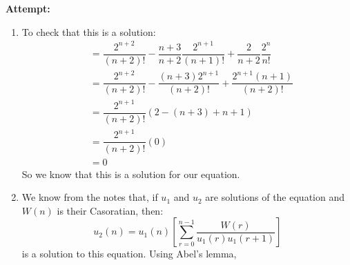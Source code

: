 \documentclass[12pt,letterpaper]{article}
\theoremstyle{definition}
\begin{document}
\textbf{Attempt:}
\begin{changemargin}{.5cm}{0cm}

\begin{enumerate}[label=(\alph*)]
    \item To check that this is a solution: \begin{align*}
        &=\dfrac{2^{n+2}}{(n+2)!} - \dfrac{n+3}{n+2}\dfrac{2^{n+1}}{(n+1)!} + \dfrac{2}{n+2}\dfrac{2^n}{n!}\\
        &=\dfrac{2^{n+2}}{(n+2)!} - \dfrac{(n+3)2^{n+1}}{(n+2)!} + \dfrac{2^{n+1}(n+1)}{(n+2)!}\\
        &=\dfrac{2^{n+1}}{(n+2)!} \left(2- (n+3) + n+1\right)\\
        &=\dfrac{2^{n+1}}{(n+2)!}(0)\\
        &=0
    \end{align*}
    So we know that this is a solution for our equation.
    \item We know from the notes that, if $u_1$ and $u_2$ are solutions of the equation and $W(n)$ is their Casoratian, then: 
    \begin{equation*}
        u_2(n) = u_1(n) \left[\sum_{r=0}^{n-1}\frac{W(r)}{u_1(r)u_1(r+1)} \right]
    \end{equation*}
    is a solution to this equation. Using Abel's lemma,
    
    

\end{enumerate}
\end{changemargin}
\end{document}

